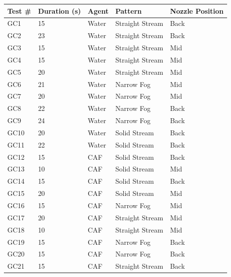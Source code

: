 \documentclass[12pt,oneside]{book}
\begin{document}
\begin{table}[!ht]
\footnotesize
\centering
{}\label{tab:spray_density_tests}
\begin{tabular}{lllll}
\toprule[1.5pt]
Test \#    &  Duration (s)  & Agent  &  Pattern            	& Nozzle Position  \\
\midrule
GC1        &  15            & Water  &  Straight Stream    	& Back             \\
GC2        &  23            & Water  &  Straight Stream    	& Back             \\
GC3        &  15            & Water  &  Straight Stream    	& Mid              \\
GC4        &  15            & Water  &  Straight Stream    	& Mid              \\
GC5        &  20            & Water  &  Straight Stream 	& Mid              \\
GC6        &  21            & Water  &  Narrow Fog   		& Mid              \\
GC7        &  20            & Water  &  Narrow Fog   		& Mid              \\
GC8        &  22            & Water  &  Narrow Fog   		& Back             \\
GC9        &  24            & Water  &  Narrow Fog   		& Back             \\
GC10       &  20            & Water  &  Solid Stream       	& Back             \\
GC11       &  22            & Water  &  Solid Stream       	& Back             \\
GC12       &  15            & CAF    &  Solid Stream       	& Back             \\
GC13       &  10            & CAF    &  Solid Stream       	& Mid              \\
GC14       &  15            & CAF    &  Solid Stream       	& Back             \\
GC15       &  20            & CAF    &  Solid Stream       	& Mid              \\
GC16       &  15            & CAF    &  Narrow Fog   		& Mid              \\
GC17       &  20            & CAF    &  Straight Stream    	& Mid             \\
GC18       &  10            & CAF    &  Straight Stream    	& Mid             \\
GC19       &  15            & CAF    &  Narrow Fog   		& Back             \\
GC20       &  15            & CAF    &  Narrow Fog   		& Back             \\
GC21       &  15            & CAF    &  Straight Stream    	& Back             \\
\bottomrule[1.25pt]
\end{tabular}\par
\end{table}
\end{document}
